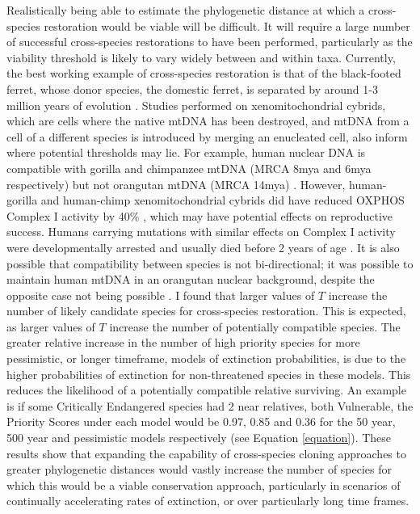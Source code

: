 \documentclass[10pt]{article}
\begin{document}
	Realistically being able to estimate the phylogenetic distance at which
	a cross-species restoration would be viable will be difficult. It will
	require a large number of successful cross-species restorations to
	have been performed, particularly as the viability threshold
	is likely to vary widely
	between and within taxa. Currently, the best working example of cross-species
	restoration is that of the black-footed ferret, whose donor species, the
	domestic ferret, is separated by around 1-3 million years of evolution
	\citep{frittsConservationFirstCloned2022}. Studies performed on xenomitochondrial
	cybrids, which are cells where the native mtDNA has
	been destroyed, and mtDNA from a cell of a different species is introduced
	by merging an enucleated cell, also inform where potential thresholds
	may lie.
	For example, human nuclear DNA
	is compatible with gorilla and chimpanzee mtDNA (MRCA 8mya and 6mya respectively)
	but not orangutan mtDNA (MRCA 14mya)
	\citep{kenyonExpandingFunctionalHuman1997}. However, human-gorilla and
	human-chimp xenomitochondrial cybrids did have reduced
	OXPHOS Complex I activity by 40\%
	\citep{barrientosHumanXenomitochondrialCybrids1998}, which may have potential effects on reproductive success. Humans carrying mutations with similar effects on Complex
	I activity were developmentally arrested and usually died before 2 years of
	age \citep{gershoniMitochondrialBioenergeticsMajor2009}. It is also possible
	that compatibility between species is not bi-directional; it was possible to
	maintain human mtDNA in an orangutan nuclear background, despite the opposite
	case not being possible \citep{bayona-bafaluyFastAdaptiveCoevolution2005}. I
	found that
	larger values of $T$ increase the number of likely candidate species
	for cross-species restoration. This is
	expected, as larger values of $T$ increase the number of potentially
	compatible species. The greater relative increase in the number of high priority
	species for more pessimistic, or longer timeframe, models of extinction
	probabilities, is due to the higher probabilities of extinction for non-threatened
	species in these models. This reduces the likelihood of a potentially
	compatible relative surviving.
	An example is if some Critically Endangered species had 2 near relatives,
	both Vulnerable, the Priority Scores
	under each model would be 0.97, 0.85 and 0.36 for the 50 year, 500 year and
	pessimistic models respectively (see Equation \ref{equation}). These results
	show that expanding
	the capability of cross-species cloning approaches to greater phylogenetic
	distances would vastly increase the number of species for which this would be
	a viable conservation approach, particularly in scenarios of continually
	accelerating rates of extinction, or over particularly long time frames. 
	
\end{document}
